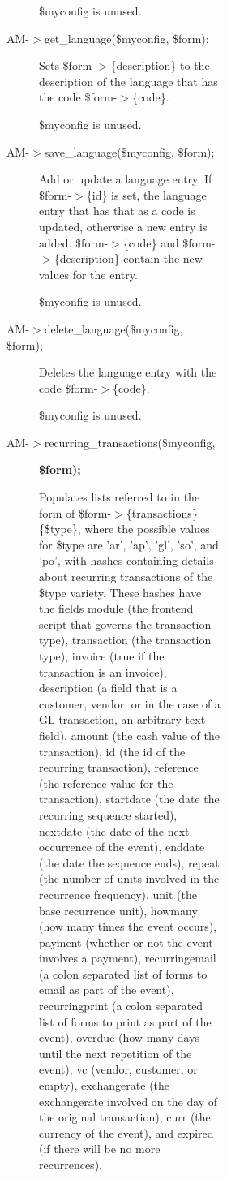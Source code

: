 \begin{description}
\begin{description}
\begin{description}
\begin{description}
\begin{description}
\begin{description}
\begin{description}
\$myconfig is unused.


\item[{AM-$>$get\_language(\$myconfig, \$form);}] \mbox{}

Sets \$form-$>$\{description\} to the description of the language that has the code
\$form-$>$\{code\}.



\$myconfig is unused.


\item[{AM-$>$save\_language(\$myconfig, \$form);}] \mbox{}

Add or update a language entry.  If \$form-$>$\{id\} is set, the language entry that
has that as a code is updated, otherwise a new entry is added.  \$form-$>$\{code\}
and \$form-$>$\{description\} contain the new values for the entry.



\$myconfig is unused.


\item[{AM-$>$delete\_language(\$myconfig, \$form);}] \mbox{}

Deletes the language entry with the code \$form-$>$\{code\}.



\$myconfig is unused.


\item[{AM-$>$recurring\_transactions(\$myconfig,}] \textbf{\$form);}

Populates lists referred to in the form of \$form-$>$\{transactions\}\{\$type\}, where
the possible values for \$type are 'ar', 'ap', 'gl', 'so', and 'po', with hashes
containing details about recurring transactions of the \$type variety.  These
hashes have the fields module (the frontend script that governs the transaction
type), transaction (the transaction type), invoice (true if the transaction is
an invoice), description (a field that is a customer, vendor, or in the case of
a GL transaction, an arbitrary text field), amount (the cash value of the
transaction), id (the id of the recurring transaction), reference (the
reference value for the transaction), startdate (the date the recurring
sequence started), nextdate (the date of the next occurrence of the event),
enddate (the date the sequence ends), repeat (the number of units involved in
the recurrence frequency), unit (the base recurrence unit), howmany (how many
times the event occurs), payment (whether or not the event involves a payment),
recurringemail (a colon separated list of forms to email as part of the event),
recurringprint (a colon separated list of forms to print as part of the event),
overdue (how many days until the next repetition of the event), vc (vendor,
customer, or empty), exchangerate (the exchangerate involved on the day of the
original transaction), curr (the currency of the event), and expired (if there
will be no more recurrences).




\end{description}
\end{description}
\end{description}
\end{description}
\end{description}
\end{description}
\end{description}
